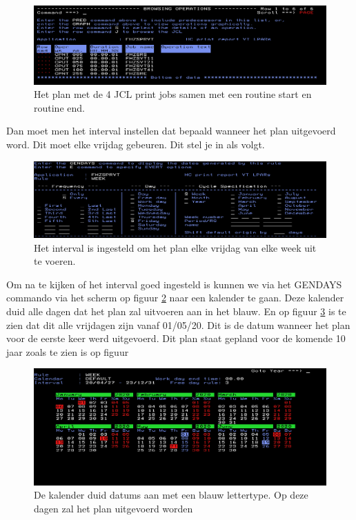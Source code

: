 \begin{figure}[h]
	\centering
	\includegraphics[width=1\linewidth]{img/IWS}
	\caption[Plan voor de print jobs]{Het plan met de 4 JCL print jobs samen met een routine start en routine end.}
	\label{fig:iws}
\end{figure}

Dan moet men het interval instellen dat bepaald wanneer het plan uitgevoerd word. Dit moet elke vrijdag gebeuren. Dit stel je in als volgt.

\begin{figure}[h]
	\centering
	\includegraphics[width=1\linewidth]{img/Interval}
	\caption[Interval in IWS]{Het interval is ingesteld om het plan elke vrijdag van elke week uit te voeren.}
	\label{fig:interval}
\end{figure}

Om na te kijken of het interval goed ingesteld is kunnen we via het GENDAYS commando via het scherm op figuur \ref{fig:interval} naar een kalender te gaan. Deze kalender duid alle dagen dat het plan zal uitvoeren aan in het blauw. En op figuur \ref{fig:calender} is te zien dat dit alle vrijdagen zijn vanaf 01/05/20. Dit is de datum wanneer het plan voor de eerste keer werd uitgevoerd. Dit plan staat gepland voor de komende 10 jaar zoals te zien is op figuur 

\begin{figure}[h]
	\centering
	\includegraphics[width=1\linewidth]{img/Calender}
	\caption[Kalender IWS]{De kalender duid datums aan met een blauw lettertype. Op deze dagen zal het plan uitgevoerd worden}
	\label{fig:calender}
\end{figure}

